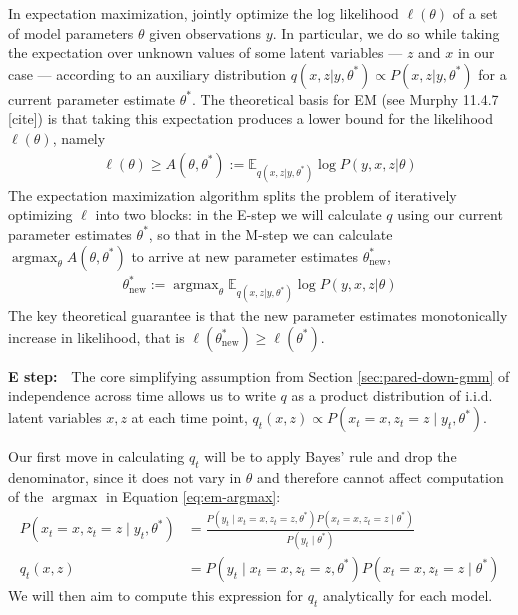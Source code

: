 \documentclass{article}         %
\DeclareMathOperator{\argmax}{\arg\max}
\newcommand{\EE}{\mathbb{E}}
\begin{document}
In expectation maximization, jointly optimize the log likelihood $\ell(\theta)$ of a set of model parameters $\theta$ given observations $y$. In particular, we do so while taking the expectation over unknown values of some latent variables --- $z$ and $x$ in our case --- according to an auxiliary distribution $q(x, z | y, \theta^*) \propto P(x, z | y, \theta^*)$ for a current parameter estimate $\theta^*$. The theoretical basis for EM (see Murphy 11.4.7 [cite]) is that taking this expectation produces a lower bound for the likelihood $\ell(\theta)$, namely
\begin{align}
    \ell(\theta) \geq A(\theta, \theta^*) := \EE_{q(x, z | y, \theta^*)} \log P(y, x, z | \theta)
\end{align}
The expectation maximization algorithm splits the problem of iteratively optimizing $\ell$ into two blocks: in the E-step we will calculate $q$ using our current parameter estimates $\theta^*$, so that in the M-step we can calculate $\argmax_\theta A(\theta, \theta^*)$ to arrive at new parameter estimates $\theta^*_{\text{new}}$,
\begin{align}
    \theta^*_{\text{new}} := \argmax_{\theta} \EE_{q(x, z | y, \theta^*)} \log P(y, x, z | \theta) \label{eq:em-argmax}
\end{align}
The key theoretical guarantee is that the new parameter estimates monotonically increase in likelihood, that is $\ell(\theta^*_{\text{new}}) \geq \ell(\theta^*)$.



\textbf{E step:}\ \ The core simplifying assumption from Section \ref{sec:pared-down-gmm} of independence across time allows us to write $q$ as a product distribution of i.i.d. latent variables $x, z$ at each time point, $q_t(x, z) \propto P(x_t = x, z_t = z \mid y_t, \theta^*)$.

Our first move in calculating $q_t$ will be to apply Bayes' rule and drop the denominator, since it does not vary in $\theta$ and therefore cannot affect computation of the $\argmax$ in Equation \ref{eq:em-argmax}:
\begin{align}
    \label{eq:latent-posterior-bayes}
    P(x_t = x, z_t = z \mid y_t, \theta^*) &= \frac{P(y_t \mid x_t = x, z_t = z, \theta^*)P(x_t = x, z_t = z \mid \theta^*)}{P(y_t \mid \theta^*)} \\
    q_t(x, z) &= P(y_t \mid x_t = x, z_t = z, \theta^*)P(x_t = x, z_t = z \mid \theta^*) \label{eq:general-qt}
\end{align}
We will then aim to compute this expression for $q_t$ analytically for each model.
\end{document}
